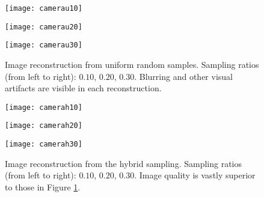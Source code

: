 \documentclass[11pt, oneside]{article}   %
\begin{document}
\begin{figure}[htb!]
        \centering 
\begin{minipage}{.32\textwidth}
     \texttt{[image: camerau10]}
\end{minipage}
\begin{minipage}{.32\textwidth}
      \texttt{[image: camerau20]}
\end{minipage}
\begin{minipage}{.32\textwidth}
      \texttt{[image: camerau30]}
\end{minipage}
\caption{Image reconstruction from uniform random samples. Sampling ratios (from left to right): $0.10$, $0.20$, $0.30$. Blurring and other visual artifacts are visible in each reconstruction.}
\label{camerau}
\end{figure}
\begin{comment}
\begin{figure}
        \centering 
\begin{minipage}{.32\textwidth}
     \texttt{[image: cameral10]}
\end{minipage}
\begin{minipage}{.32\textwidth}
      \texttt{[image: cameral20]}
\end{minipage}
\begin{minipage}{.32\textwidth}
      \texttt{[image: cameral30]}
\end{minipage}
\caption{Image reconstruction from only low frequency samples. Sampling ratios (from left to right): $0.10$, $0.20$, $0.30$.}
\label{cameral}
\end{figure}
\end{comment}
\begin{figure}[htb!]
        \centering 
\begin{minipage}{.32\textwidth}
     \texttt{[image: camerah10]}
\end{minipage}
\begin{minipage}{.32\textwidth}
      \texttt{[image: camerah20]}
\end{minipage}
\begin{minipage}{.32\textwidth}
      \texttt{[image: camerah30]}
\end{minipage}
\caption{Image reconstruction from the hybrid sampling. Sampling ratios (from left to right): $0.10$, $0.20$, $0.30$. Image quality is vastly superior to those in Figure \ref{camerau}.}
\label{camerah}
\end{figure}
\end{document}
